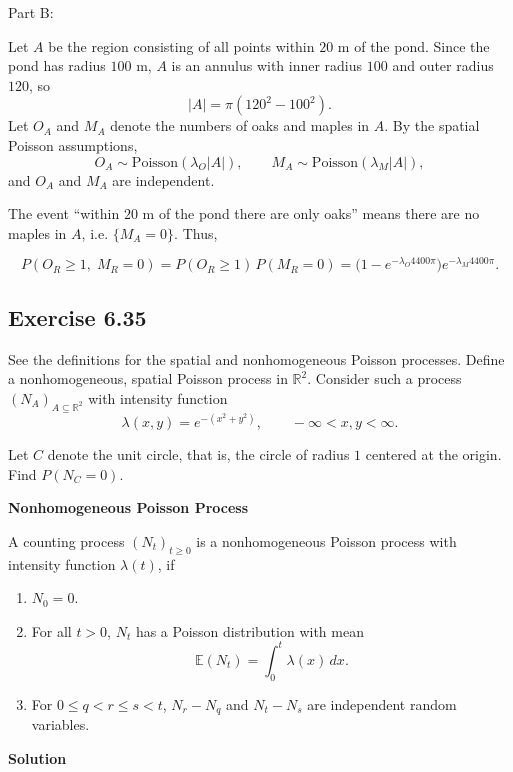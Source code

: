 \documentclass[hidelinks]{article}
\begin{document}
\noindent Part B:

\noindent Let $A$ be the region consisting of all points within $20$ m of the pond.
Since the pond has radius $100$ m, $A$ is an annulus with inner radius $100$ and outer radius $120$, so
\[
|A|=\pi(120^2-100^2).
\]
Let $O_A$ and $M_A$ denote the numbers of oaks and maples in $A$. By the spatial Poisson assumptions,
\[
O_A \sim \text{Poisson}(\lambda_O |A|), 
\qquad
M_A \sim \text{Poisson}(\lambda_M |A|),
\]
and $O_A$ and $M_A$ are independent.

\noindent The event ``within $20$ m of the pond there are only oaks'' means there are no maples in $A$, i.e. $\{M_A=0\}$.
Thus,

\[
P(O_R \ge 1,\; M_R = 0)
= P(O_R \ge 1)\,P(M_R=0)
= \bigl(1-e^{-\lambda_O 4400\pi}\bigr)e^{-\lambda_M 4400\pi}.
\]

\subsection{Exercise 6.35}

\noindent See the definitions for the spatial and nonhomogeneous Poisson processes.
Define a nonhomogeneous, spatial Poisson process in $\mathbb{R}^2$.
Consider such a process $(N_A)_{A \subseteq \mathbb{R}^2}$ with intensity function
\[
\lambda(x,y) = e^{-(x^2+y^2)}, 
\qquad -\infty < x,y < \infty.
\]

\noindent Let $C$ denote the unit circle, that is, the circle of radius $1$ centered at the origin.
Find $P(N_C = 0)$.

{\color{darkgreen}

\noindent \textbf{Nonhomogeneous Poisson Process}

\noindent A counting process $(N_t)_{t \ge 0}$ is a nonhomogeneous Poisson process with
intensity function $\lambda(t)$, if

\begin{enumerate}
    \item $N_0 = 0$.
    
    \item For all $t > 0$, $N_t$ has a Poisson distribution with mean
    \[
    \mathbb{E}(N_t) = \int_0^t \lambda(x)\,dx.
    \]
    
    \item For $0 \le q < r \le s < t$, 
    $N_r - N_q$ and $N_t - N_s$ are independent random variables.
\end{enumerate}

}

\noindent \textbf{Solution}
\end{document}
